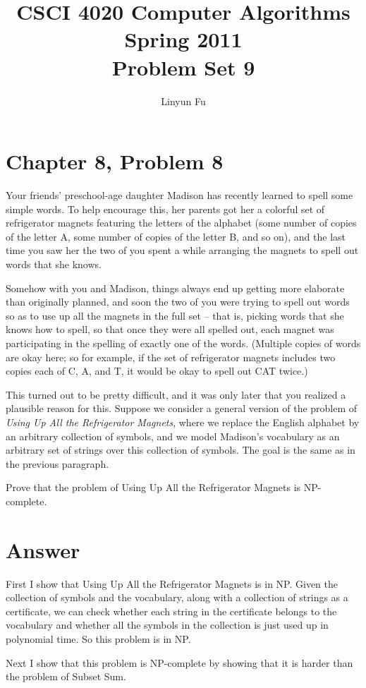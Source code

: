 \documentclass[12pt,letterpaper]{article}
\author{Linyun Fu}
\title{CSCI 4020 Computer Algorithms Spring 2011\\
Problem Set 9}
\begin{document}
\maketitle
\section*{Chapter 8, Problem 8}
Your friends' preschool-age daughter Madison has recently learned to
spell some simple words. To help encourage this, her parents got her a
colorful set of refrigerator magnets featuring the letters of the alphabet
(some number of copies of the letter A, some number of copies of the
letter B, and so on), and the last time you saw her the two of you spent a
while arranging the magnets to spell out words that she knows.

Somehow with you and Madison, things always end up getting more
elaborate than originally planned, and soon the two of you were trying
to spell out words so as to use up all the magnets in the full set -- that
is, picking words that she knows how to spell, so that once they were all
spelled out, each magnet was participating in the spelling of exactly one
of the words. (Multiple copies of words are okay here; so for example, if
the set of refrigerator magnets includes two copies each of C, A, and T, 
it would be okay to spell out CAT twice.)

This turned out to be pretty difficult, and it was only later that you
realized a plausible reason for this. Suppose we consider a general version
of the problem of \emph{Using Up All the Refrigerator Magnets}, where we replace
the English alphabet by an arbitrary collection of symbols, and we model
Madison's vocabulary as an arbitrary set of strings over this collection of
symbols. The goal is the same as in the previous paragraph.

Prove that the problem of Using Up All the Refrigerator Magnets is
NP-complete.

\section*{Answer}
First I show that Using Up All the Refrigerator Magnets is in NP. Given the collection of symbols and the vocabulary, along with a collection of strings as a certificate, we can check whether each string in the certificate belongs to the vocabulary and whether all the symbols in the collection is just used up in polynomial time. So this problem is in NP.

Next I show that this problem is NP-complete by showing that it is harder than the problem of Subset Sum.
\end{document}
